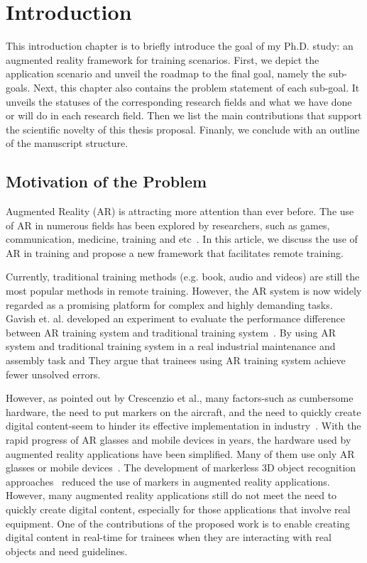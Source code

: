 \chapter{Introduction}
\label{cha:i}

This introduction chapter is to briefly introduce the goal of my Ph.D. study: an augmented reality framework for training scenarios. First, we depict the application scenario and unveil the roadmap to the final goal, namely the sub-goals.
Next, this chapter also contains the problem statement of each sub-goal. It unveils the statuses of the corresponding research fields and what we have done or will do in each research field.
Then we list the main contributions that support the scientific novelty of this thesis proposal.
Finanly, we conclude with an outline of the manuscript structure.

\section{Motivation of the Problem}
\label{sec:i:mp}

Augmented Reality (AR) is attracting more attention than ever before. The use of AR in numerous fields has been explored by researchers, such as games, communication, medicine, training and etc~\cite{nakajima2003,gonzalez-franco2016,hincapie2011,webel2011}.
In this article, we discuss the use of AR in training and propose a new framework that facilitates remote training.

Currently, traditional training methods (e.g. book, audio and videos) are still the most popular methods in remote training. However, the AR system is now widely regarded as a promising platform for complex and highly demanding tasks.
Gavish et. al. developed an experiment to evaluate the performance difference between AR training system and traditional training system~\cite{gavish2015}. By using AR system and traditional training system in a real industrial maintenance and assembly task and They argue that trainees using AR training system achieve fewer unsolved errors.

However, as pointed out by Crescenzio et al., many factors-such as cumbersome hardware, the need to put markers on the aircraft, and the need to quickly create digital content-seem to hinder its effective implementation in industry~\cite{crescenzio2011}. With the rapid progress of AR glasses and mobile devices in years, the hardware used by augmented reality applications have been simplified. Many of them use only AR glasses or mobile devices~\cite{hincapie2011,webel2011}. The development of markerless 3D object recognition approaches~\cite{tjaden2016} reduced the use of markers in augmented reality applications. However, many augmented reality applications still do not meet the need to quickly create digital content, especially for those applications that involve real equipment. One of the contributions of the proposed work is to enable creating digital content in real-time for trainees when they are interacting with real objects and need guidelines.

